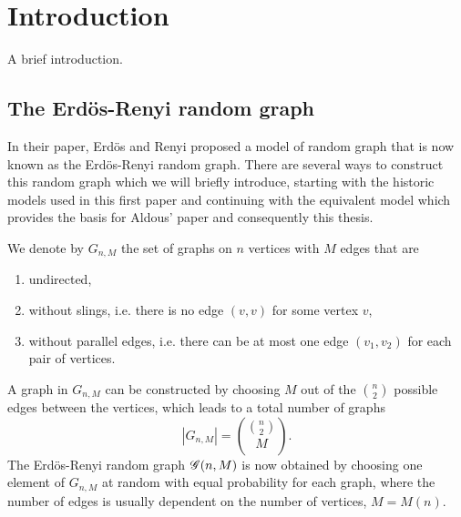 
\chapter{Introduction}

A brief introduction.
\lipsum[100]



\section{The Erdös-Renyi random graph}

In their paper, Erdös and Renyi proposed a model of random graph that is now known as the Erdös-Renyi random graph.
There are several ways to construct this random graph which we will briefly introduce,
starting with the historic models used in this first paper 
and continuing with the equivalent model which provides the basis for Aldous' paper and consequently this thesis.

We denote by $G_{n,M}$ the set of graphs on $n$ vertices with $M$ edges that are
\begin{enumerate}
	\item undirected,
	\item without slings, i.e. there is no edge $(v,v)$ for some vertex $v$,
	\item without parallel edges, i.e. there can be at most one edge $(v_1, v_2)$ for each pair of vertices.
\end{enumerate}
A graph in $G_{n,M}$ can be constructed by choosing $M$ out of the $\binom{n}{2}$ possible edges between the vertices,
which leads to a total number of graphs
\begin{equation}
	|G_{n,M}| = \binom{\binom{n}{2}}{M}.
\end{equation}
The Erdös-Renyi random graph $\mathscr{G}(n, M)$ is now obtained by choosing one element of $G_{n,M}$ at random
with equal probability for each graph, where the number of edges is usually dependent on the number of vertices, $M = M(n)$.

